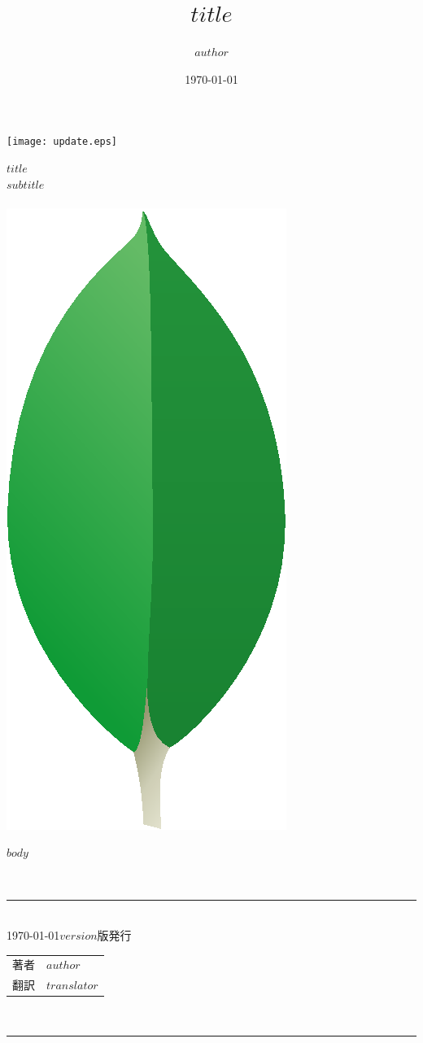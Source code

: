 \documentclass[a4j,oneside,11ptj,uplatex]{jsbook}
\title{$title$}
\author{$author$}
\date{\today}
\begin{document}
\begin{titlepage}
\begin{flushright}
\texttt{[image: update.eps]}\\
\end{flushright}
\vspace*{1em}
\begin{center}
{\HUGE\gt\sf\textbf{$title$}}
\bigskip\\
{\LARGE\it{$subtitle$}}
\bigskip\\
{\LARGE\gt{}}\\
\vspace{6em}
\includegraphics{title.eps}
\end{center}

\end{titlepage}

\clearpage

$body$

\clearpage
\thispagestyle{empty}
\vspace*{\fill}

{\noindent\Large\gt{}} \\
\rule[8pt]{14cm}{1pt} \\
{\noindent
\today $version$版発行
\noindent
}
\bigskip\\
\begin{tabular}{ll}
著者 & $author$ \\
翻訳 & $translator$ \\
\end{tabular}
\bigskip\\
\rule[0pt]{14cm}{1pt} \\
\end{document}
